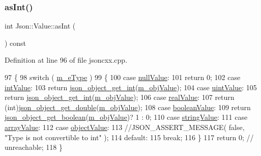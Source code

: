 \subsubsection{\texorpdfstring{as\+Int()}{asInt()}}
{\footnotesize\ttfamily int Json\+::\+Value\+::as\+Int (\begin{DoxyParamCaption}{ }\end{DoxyParamCaption}) const}



Definition at line 96 of file jsoncxx.\+cpp.


\begin{DoxyCode}
97     \{
98         \textcolor{keywordflow}{switch} ( \hyperlink{class_json_1_1_value_ae6116e08a5c1833f858c1d29156365b1}{m\_eType} )
99         \{
100         \textcolor{keywordflow}{case} \hyperlink{namespace_json_a7d654b75c16a57007925868e38212b4ea7d9899633b4409bd3fc107e6737f8391}{nullValue}:
101             \textcolor{keywordflow}{return} 0;
102         \textcolor{keywordflow}{case} \hyperlink{namespace_json_a7d654b75c16a57007925868e38212b4eae5a9d708d5c9e23ae9bf98898522512d}{intValue}:
103             \textcolor{keywordflow}{return} \hyperlink{json__object_8c_a53d286175d6a30ea1c961623a724a48f}{json\_object\_get\_int}(\hyperlink{class_json_1_1_value_a3a705e06c2dbc4a6e142b58b0cbca57e}{m\_objValue});
104         \textcolor{keywordflow}{case} \hyperlink{namespace_json_a7d654b75c16a57007925868e38212b4eaea788d9a3bb00adc6d68d97d43e1ccd3}{uintValue}:
105             \textcolor{keywordflow}{return} \hyperlink{json__object_8c_a53d286175d6a30ea1c961623a724a48f}{json\_object\_get\_int}(\hyperlink{class_json_1_1_value_a3a705e06c2dbc4a6e142b58b0cbca57e}{m\_objValue});
106         \textcolor{keywordflow}{case} \hyperlink{namespace_json_a7d654b75c16a57007925868e38212b4eab837c7b869c14d8be712deb45c9e490e}{realValue}:
107             \textcolor{keywordflow}{return} (\textcolor{keywordtype}{int})\hyperlink{json__object_8c_ad7a7a813a948a1be644d2334281bf09a}{json\_object\_get\_double}(\hyperlink{class_json_1_1_value_a3a705e06c2dbc4a6e142b58b0cbca57e}{m\_objValue});
108         \textcolor{keywordflow}{case} \hyperlink{namespace_json_a7d654b75c16a57007925868e38212b4ea14c30dbf4da86f7b809be299f671f7fd}{booleanValue}:
109             \textcolor{keywordflow}{return} \hyperlink{json__object_8c_a1e624d8e948b31562b6dfc7a936b85ed}{json\_object\_get\_boolean}(\hyperlink{class_json_1_1_value_a3a705e06c2dbc4a6e142b58b0cbca57e}{m\_objValue})? 1 : 0;
110         \textcolor{keywordflow}{case} \hyperlink{namespace_json_a7d654b75c16a57007925868e38212b4ea804ef857affea2d415843c73f261c258}{stringValue}:
111         \textcolor{keywordflow}{case} \hyperlink{namespace_json_a7d654b75c16a57007925868e38212b4eadc8f264f36b55b063c78126b335415f4}{arrayValue}:
112         \textcolor{keywordflow}{case} \hyperlink{namespace_json_a7d654b75c16a57007925868e38212b4eae8386dcfc36d1ae897745f7b4f77a1f6}{objectValue}:
113             \textcolor{comment}{//JSON\_ASSERT\_MESSAGE( false, "Type is not convertible to int" );}
114         \textcolor{keywordflow}{default}:
115             \textcolor{keywordflow}{break};
116         \}
117         \textcolor{keywordflow}{return} 0; \textcolor{comment}{// unreachable;}
118     \}
\end{DoxyCode}
